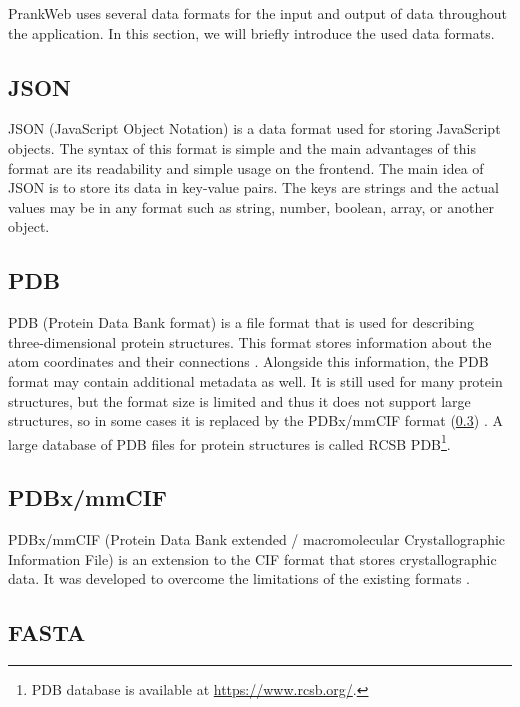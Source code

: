 PrankWeb uses several data formats for the input and output of data throughout the application. In this section, we will briefly introduce the used data formats.


\subsection{JSON}
\label{subsec:json}

JSON (JavaScript Object Notation) is a data format used for storing JavaScript objects. The syntax of this format is simple and the main advantages of this format are its readability and simple usage on the frontend. The main idea of JSON is to store its data in key-value pairs. The keys are strings and the actual values may be in any format such as string, number, boolean, array, or another object.

\subsection{PDB}
\label{subsec:PDB}

PDB (Protein Data Bank format) is a file format that is used for describing three-dimensional protein structures. This format stores information about the atom coordinates and their connections \cite{bernstein1977protein}. Alongside this information, the PDB format may contain additional metadata as well. It is still used for many protein structures, but the format size is limited and thus it does not support large structures, so in some cases it is replaced by the PDBx/mmCIF format (\cref{subsec:PDBx_mmCIF}) \cite{adams2019announcing}. A large database of PDB files for protein structures is called RCSB PDB\footnote{PDB database is available at \url{https://www.rcsb.org/}.}.

\subsection{PDBx/mmCIF}
\label{subsec:PDBx_mmCIF}

PDBx/mmCIF (Protein Data Bank extended / macromolecular Crystallographic Information File) is an extension to the CIF format that stores crystallographic data. It was developed to overcome the limitations of the existing formats \cite{bourne199730}.

\subsection{FASTA}
\label{subsec:FASTA}

